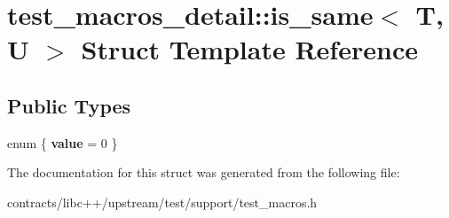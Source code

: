 \hypertarget{structtest__macros__detail_1_1is__same}{}\section{test\+\_\+macros\+\_\+detail\+:\+:is\+\_\+same$<$ T, U $>$ Struct Template Reference}
\label{structtest__macros__detail_1_1is__same}
\subsection*{Public Types}
\begin{DoxyCompactItemize}
\item 
\mbox{\label{structtest__macros__detail_1_1is__same_aab98537dd29f2305a6afd678c4df5531}} 
enum \{ {\bfseries value} = 0
 \}
\end{DoxyCompactItemize}


The documentation for this struct was generated from the following file\+:\begin{DoxyCompactItemize}
\item 
contracts/libc++/upstream/test/support/test\+\_\+macros.\+h\end{DoxyCompactItemize}
